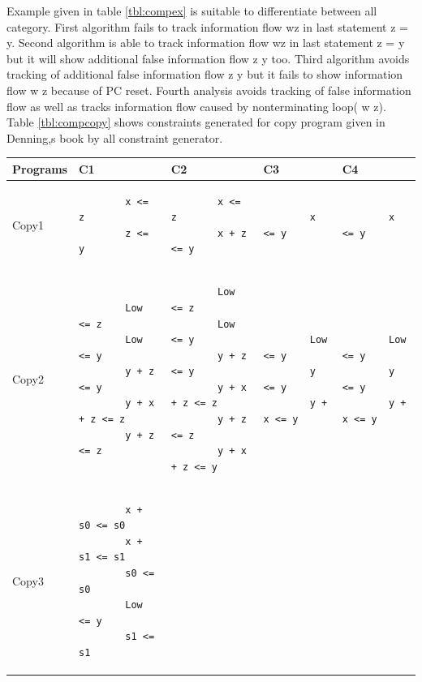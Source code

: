 Example given in table \ref{tbl:compex} is suitable to differentiate between all category.
First algorithm fails to track information flow w\marr z in last statement z = y.
Second algorithm is able to track information flow w\marr z in last statement z = y but it will show additional false information flow z \marr y too. 
Third algorithm avoids tracking of additional false information flow z \marr y but it fails to show information flow w \marr z because of PC reset.
Fourth analysis avoids tracking of false information flow as well as tracks information flow caused by nonterminating loop( w \marr z). Table \ref{tbl:compcopy} shows constraints generated for copy program given in Denning,s book by all constraint generator.
\begin{table}
	\hspace{-2cm}
	\begin{tabular}{|l|l|l|l|l|}
		\hline
		Programs  &  C1 & C2 & C3 & C4 \\
		\hline
		Copy1&
		\begin{lstlisting}
		x <= z
		z <= y
		\end{lstlisting}&
		\begin{lstlisting}
		x <= z
		x + z <= y
		\end{lstlisting}&
		\begin{lstlisting}
		x <= y
		\end{lstlisting}&
		\begin{lstlisting}
		x <= y
		\end{lstlisting}\\
		\hline
		Copy2&
		\begin{lstlisting}
		Low <= z
		Low <= y
		y + z <= y
		y + x + z <= z
		y + z <= z
		\end{lstlisting}&
		\begin{lstlisting}
		Low <= z
		Low <= y
		y + z <= y
		y + x + z <= z
		y + z <= z
		y + x + z <= y
		\end{lstlisting}&
		\begin{lstlisting}
		Low <= y
		y <= y
		y + x <= y
		\end{lstlisting}&
		\begin{lstlisting}
		Low <= y
		y <= y
		y + x <= y
		\end{lstlisting}
		\\
		\hline
		Copy3&
		\begin{lstlisting}
		x + s0 <= s0
		x + s1 <= s1
		s0 <= s0
		Low <= y
		s1 <= s1
		\end{lstlisting}&
		\begin{lstlisting}

\end{lstlisting}
\end{tabular}
\end{table}
